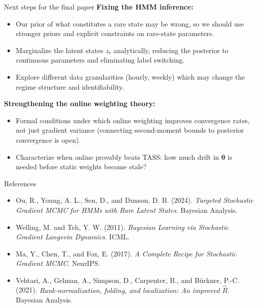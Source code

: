 \documentclass[aspectratio=169]{beamer}
\newcommand{\btheta}{\boldsymbol{\theta}}
\begin{document}
\begin{frame}{Next steps for the final paper}
  \textbf{Fixing the HMM inference:}
  \begin{itemize}
    \item Our prior of what constitutes a rare state may be wrong, so we should use stronger priors and explicit constraints on rare-state parameters.
    \item Marginalize the latent states $z_t$ analytically, reducing the posterior to continuous parameters and eliminating label switching.
    \item Explore different data granularities (hourly, weekly) which may change the regime structure and identifiability.
  \end{itemize}

  \vspace{0.3em}
  \textbf{Strengthening the online weighting theory:}
  \begin{itemize}
    \item Formal conditions under which online weighting improves convergence rates, not just gradient variance (connecting second-moment bounds to posterior convergence is open).
    \item Characterize when online provably beats TASS: how much drift in $\btheta$ is needed before static weights become stale?
  \end{itemize}
\end{frame}

\begin{frame}{References}
  \footnotesize
  \begin{itemize}
    \item Ou, R., Young, A. L., Sen, D., and Dunson, D. B. (2024). \textit{Targeted Stochastic Gradient MCMC for HMMs with Rare Latent States}. Bayesian Analysis.
    \item Welling, M. and Teh, Y. W. (2011). \textit{Bayesian Learning via Stochastic Gradient Langevin Dynamics}. ICML.
    \item Ma, Y., Chen, T., and Fox, E. (2017). \textit{A Complete Recipe for Stochastic Gradient MCMC}. NeurIPS.
    \item Vehtari, A., Gelman, A., Simpson, D., Carpenter, B., and B\"urkner, P.-C. (2021). \textit{Rank-normalization, folding, and localization: An improved $\hat{R}$}. Bayesian Analysis.
  \end{itemize}
\end{frame}
\end{document}
